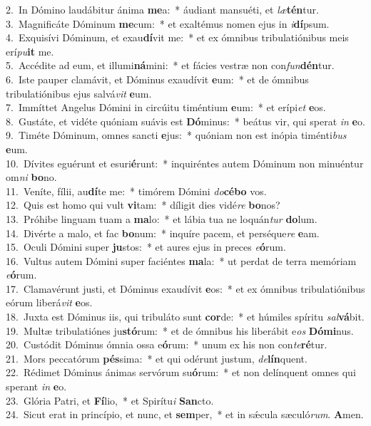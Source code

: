 {2.~}In Dómino laudábitur ánima \textbf{me}a:~* áudiant mansuéti, et \textit{læ}\textbf{tén}tur.\\
{3.~}Magnificáte Dóminum \textbf{me}cum:~* et exaltémus nomen ejus in \textit{i}\textbf{dí}psum.\\
{4.~}Exquisívi Dóminum, et exau\textbf{dí}vit me:~* et ex ómnibus tribulatiónibus meis erí\textit{pu}\textbf{it} me.\\
{5.~}Accédite ad eum, et illumi\textbf{ná}mini:~* et fácies vestræ non con\textit{fun}\textbf{dén}tur.\\
{6.~}Iste pauper clamávit, et Dóminus exaudívit \textbf{e}um:~* et de ómnibus tribulatiónibus ejus salvá\textit{vit} \textbf{e}um.\\
{7.~}Immíttet Angelus Dómini in circúitu timéntium \textbf{e}um:~* et erípi\textit{et} \textbf{e}os.\\
{8.~}Gustáte, et vidéte quóniam suávis est \textbf{Dó}minus:~* beátus vir, qui sperat \textit{in} \textbf{e}o.\\
{9.~}Timéte Dóminum, omnes sancti \textbf{e}jus:~* quóniam non est inópia timénti\textit{bus} \textbf{e}um.\\
{10.~}Dívites eguérunt et esuri\textbf{é}runt:~* inquiréntes autem Dóminum non minuéntur om\textit{ni} \textbf{bo}no.\\
{11.~}Veníte, fílii, au\textbf{dí}te me:~* timórem Dómini \textit{do}\textbf{cé}\textbf{bo} vos.\\
{12.~}Quis est homo qui vult \textbf{vi}tam:~* díligit dies vidé\textit{re} \textbf{bo}nos?\\
{13.~}Próhibe linguam tuam a \textbf{ma}lo:~* et lábia tua ne loquán\textit{tur} \textbf{do}lum.\\
{14.~}Divérte a malo, et fac \textbf{bo}num:~* inquíre pacem, et perséque\textit{re} \textbf{e}am.\\
{15.~}Oculi Dómini super \textbf{ju}stos:~* et aures ejus in preces \textit{e}\textbf{ó}rum.\\
{16.~}Vultus autem Dómini super faciéntes \textbf{ma}la:~* ut perdat de terra memóriam \textit{e}\textbf{ó}rum.\\
{17.~}Clamavérunt justi, et Dóminus exaudívit \textbf{e}os:~* et ex ómnibus tribulatiónibus eórum liberá\textit{vit} \textbf{e}os.\\
{18.~}Juxta est Dóminus iis, qui tribuláto sunt \textbf{cor}de:~* et húmiles spíritu \textit{sal}\textbf{vá}bit.\\
{19.~}Multæ tribulatiónes ju\textbf{stó}rum:~* et de ómnibus his liberábit e\textit{os} \textbf{Dó}\textbf{mi}nus.\\
{20.~}Custódit Dóminus ómnia ossa e\textbf{ó}rum:~* unum ex his non con\textit{te}\textbf{ré}tur.\\
{21.~}Mors peccatórum \textbf{pés}sima:~* et qui odérunt justum, \textit{de}\textbf{lín}quent.\\
{22.~}Rédimet Dóminus ánimas servórum su\textbf{ó}rum:~* et non delínquent omnes qui sperant \textit{in} \textbf{e}o.\\
{23.~}Glória Patri, et \textbf{Fí}lio,~* et Spirítu\textit{i} \textbf{San}cto.\\
{24.~}Sicut erat in princípio, et nunc, et \textbf{sem}per,~* et in sǽcula sæculó\textit{rum}. \textbf{A}men.\\
